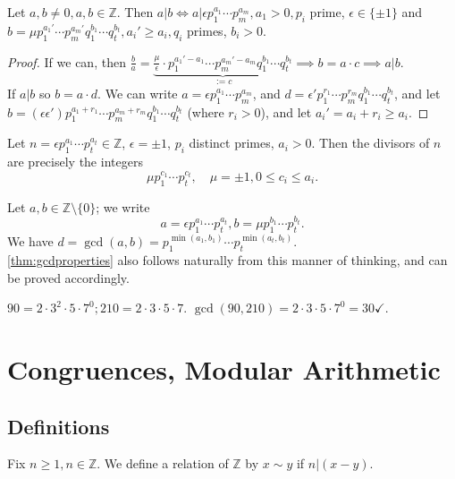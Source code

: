 \documentclass[12pt,oneside]{article}
\begin{document}
\begin{proposition}
  Let $a,b \neq 0, a,b \in \mathbb{Z}$. Then $a|b \iff a| \epsilon p_1^{a_1} \cdots p_m^{a_m}, a_1 > 0, p_i$ prime, $\epsilon \in \{\pm 1\}$ and $b = \mu p_1^{a_1'} \cdots p_m^{a_m'}q_1^{b_1}\cdots q_t^{b_t},a_i' \geq a_i, q_i$ primes, $b_i > 0$.
\end{proposition}

\begin{proof}
  If we can, then $\frac{b}{a} = \underbrace{\frac{\mu}{\epsilon} \cdot p_1^{a_1'-a_1}\cdots p_m^{a_m'-a_m}q_1^{b_1}\cdots q_t^{b_t}}_{:=c} \implies b = a \cdot c \implies a|b$.\\
  If $a|b$ so $b = a \cdot d$. We can write $a = \epsilon p_1^{a_1}\cdots p_m^{a_m}$, and $d = \epsilon' p_1^{r_1}\cdots p_m^{r_m}q_1^{b_1}\cdots q_t^{b_t}$, and let $b = (\epsilon \epsilon ')p_1^{a_1 + r_1} \cdots p_m^{a_m+r_m} q_1^{b_1}\cdots q_t^{b_t}$ (where $r_i > 0$), and let $a_i' = a_i+r_i \geq a_i$.
\end{proof}

\begin{corollary}
  Let $n = \epsilon p_1^{a_1}\cdots p_t^{a_t} \in \mathbb{Z}$, $\epsilon = \pm 1$, $p_i$ distinct primes, $a_i > 0$. Then the divisors of $n$ are precisely the integers \[\mu p_1^{c_1}\cdots p_t^{c_t}, \quad \mu = \pm 1, 0 \leq c_i \leq a_i.\]
\end{corollary}

\begin{remark}
  Let $a,b \in \mathbb{Z}\setminus \{0\}$; we write \[a = \epsilon p_1 ^{a_1} \cdots p_t^{a_t}, b = \mu p_1^{b_1}\cdots p_t^{b_t}.\] We have $d = \gcd(a,b) = p_1^{\min(a_1,b_1)}\cdots p_t^{\min(a_t,b_t)}$.\\
  \cref{thm:gcdproperties} also follows naturally from this manner of thinking, and can be proved accordingly.
\end{remark}

\begin{example}
  $90 = 2 \cdot 3^2 \cdot 5 \cdot 7^0; 210 = 2 \cdot 3 \cdot 5 \cdot 7$. $\gcd(90,210) = 2 \cdot 3 \cdot 5 \cdot 7^0 = 30\checkmark$.
\end{example}

\section{Congruences, Modular Arithmetic}
\subsection{Definitions}
\begin{definition}
  Fix $n \geq 1, n \in \mathbb{Z}$. We define a relation of $\mathbb{Z}$ by $x \sim y$ if $n | (x-y)$.
\end{definition}
\end{document}
